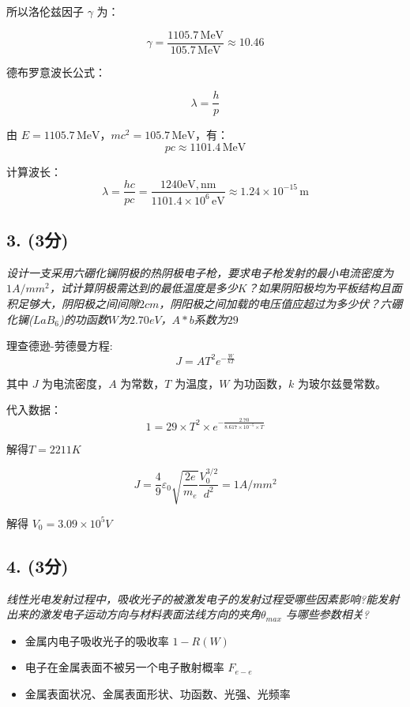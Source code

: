 \documentclass{article}
\begin{document}
所以洛伦兹因子 $ \gamma $ 为：

$$\gamma = \frac{1105.7 \, \text{MeV}}{105.7 \, \text{MeV}} \approx 10.46$$

德布罗意波长公式：

$$\lambda = \frac{h}{p}$$

由 $ E = 1105.7 \, \text{MeV} $，$ m c^2 = 105.7 \, \text{MeV} $，有：$$p c \approx 1101.4 \, \text{MeV}$$

计算波长：$$\lambda = \frac{h c}{p c} = \frac{1240 \text{eV}, \text{nm}}{1101.4 \times 10^6 \, \text{eV}} \approx 1.24 \times 10^{-15} \, \text{m}$$

\subsection*{3. (3分)}

\emph{设计一支采用六硼化镧阴极的热阴极电子枪，要求电子枪发射的最小电流密度为$1A/mm^2$，试计算阴极需达到的最低温度是多少$K$？如果阴阳极均为平板结构且面积足够大，阴阳极之间间隙$2cm$，阴阳极之间加载的电压值应超过为多少伏？六硼化镧($LaB_6$)的功函数$W$为$2.70eV$，$A*b$系数为$29$}

理查德逊-劳德曼方程:$$J = A T^2 e^{-\frac{W}{kT}}$$

其中 $J$ 为电流密度，$A$ 为常数，$T$ 为温度，$W$ 为功函数，$k$ 为玻尔兹曼常数。

代入数据：$$1 = 29 \times T^2 \times e^{-\frac{2.70}{8.617 \times 10^{-5} \times T}}$$

解得$ T = 2211K $

$$J = \frac{4}{9} \varepsilon_0 \sqrt{\frac{2e}{m_e}} \frac{V_0^{3/2}}{d^2} = 1A/mm^2$$

解得 $V_0 = 3.09\times10^5V$

\subsection*{4. (3分)}

\emph{线性光电发射过程中，吸收光子的被激发电子的发射过程受哪些因素影响?能发射出来的激发电子运动方向与材料表面法线方向的夹角$\theta_{max} $ 与哪些参数相关?}

\begin{itemize}
    \item 金属内电子吸收光子的吸收率 $1-R(W)$
    \item 电子在金属表面不被另一个电子散射概率 $F_{e-e}$
    \item 金属表面状况、金属表面形状、功函数、光强、光频率
\end{itemize}
\end{document}

